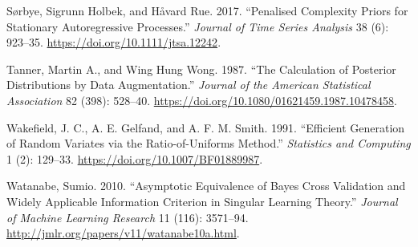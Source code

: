 \documentclass[
  11pt,
  letterpaper,
]{scrbook}
\newlength{\cslhangindent}
\newenvironment{CSLReferences}[2] %
 {\begin{list}{}{%
  \setlength{\itemindent}{0pt}
  \setlength{\leftmargin}{0pt}
  \setlength{\parsep}{0pt}
  \ifodd #1
   \setlength{\leftmargin}{\cslhangindent}
   \setlength{\itemindent}{-1\cslhangindent}
  \fi
  \setlength{\itemsep}{#2\baselineskip}}}
 {\end{list}}
\theoremstyle{definition}
\theoremstyle{definition}
\theoremstyle{definition}
\theoremstyle{plain}
\theoremstyle{plain}
\theoremstyle{remark}
\begin{document}
\begin{CSLReferences}{1}{0}
Sørbye, Sigrunn Holbek, and Håvard Rue. 2017. {``Penalised Complexity
Priors for Stationary Autoregressive Processes.''} \emph{Journal of Time
Series Analysis} 38 (6): 923--35.
\url{https://doi.org/10.1111/jtsa.12242}.

Tanner, Martin A., and Wing Hung Wong. 1987. {``The Calculation of
Posterior Distributions by Data Augmentation.''} \emph{Journal of the
American Statistical Association} 82 (398): 528--40.
\url{https://doi.org/10.1080/01621459.1987.10478458}.

Wakefield, J. C., A. E. Gelfand, and A. F. M. Smith. 1991. {``Efficient
Generation of Random Variates via the Ratio-of-Uniforms Method.''}
\emph{Statistics and Computing} 1 (2): 129--33.
\url{https://doi.org/10.1007/BF01889987}.

Watanabe, Sumio. 2010. {``Asymptotic Equivalence of {B}ayes Cross
Validation and Widely Applicable Information Criterion in Singular
Learning Theory.''} \emph{Journal of Machine Learning Research} 11
(116): 3571--94. \url{http://jmlr.org/papers/v11/watanabe10a.html}.

\end{CSLReferences}


\backmatter
\end{document}
